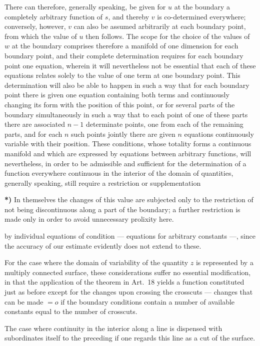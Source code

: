\documentclass{article}
\begin{document}
There can therefore, generally speaking, be given for $u$ at the boundary a completely arbitrary function of $s$, and thereby $v$ is co-determined everywhere; conversely, however, $v$ can also be assumed arbitrarily at each boundary point, from which the value of $u$ then follows. The scope for the choice of the values of $w$ at the boundary comprises therefore a manifold of one dimension for each boundary point, and their complete determination requires for each boundary point one equation, wherein it will nevertheless not be essential that each of these equations relates solely to the value of one term at one boundary point. This determination will also be able to happen in such a way that for each boundary point there is given one equation containing both terms and continuously changing its form with the position of this point, or for several parts of the boundary simultaneously in such a way that to each point of one of these parts there are associated $n - 1$ determinate points, one from each of the remaining parts, and for each $n$ such points jointly there are given $n$ equations continuously variable with their position. These conditions, whose totality forms a continuous manifold and which are expressed by equations between arbitrary functions, will nevertheless, in order to be admissible and sufficient for the determination of a function everywhere continuous in the interior of the domain of quantities, generally speaking, still require a restriction or supplementation

\textbf{*)} In themselves the changes of this value are subjected only to the restriction of not being discontinuous along a part of the boundary; a further restriction is made only in order to avoid unnecessary prolixity here.

by individual equations of condition --- equations for arbitrary constants ---, since the accuracy of our estimate evidently does not extend to these.

For the case where the domain of variability of the quantity $z$ is represented by a multiply connected surface, these considerations suffer no essential modification, in that the application of the theorem in Art.~18 yields a function constituted just as before except for the changes upon crossing the crosscuts --- changes that can be made $= o$ if the boundary conditions contain a number of available constants equal to the number of crosscuts.

The case where continuity in the interior along a line is dispensed with subordinates itself to the preceding if one regards this line as a cut of the surface.
\end{document}
